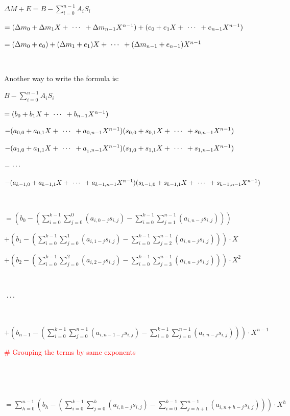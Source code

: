$\Delta M + E = B - \sum\limits_{i=0}^{n-1}A_iS_i$ 

$ = (\Delta m_0 + \Delta m_1X + \text{ } \text{$\cdots$} \text{ } + \Delta m_{n-1}X^{n-1}) + (e_0 + e_1X + \text{ } \text{$\cdots$} \text{ } + e_{n-1}X^{n-1})$

$= (\Delta m_0 + e_0) + (\Delta m_1 + e_1)X + \text{ } \text{$\cdots$} \text{ } + (\Delta m_{n-1} + e_{n-1})X^{n-1}$

$ $

\noindent Another way to write the formula is:

$B - \sum\limits_{i=0}^{n-1}A_iS_i$ 

$ = (b_0 + b_1X + \text{ } \text{$\cdots$} \text{ } + b_{n-1}X^{n-1} )$ 

$ - (a_{0,0} + a_{0,1}X + \text{ } \text{$\cdots$} \text{ } + a_{0, n-1}X^{n-1})(s_{0,0} + s_{0,1}X + \text{ } \text{$\cdots$} \text{ } + s_{0, n-1}X^{n-1})$ 

$ - (a_{1,0} + a_{1,1}X + \text{ } \text{$\cdots$} \text{ } + a_{_1, n-1}X^{n-1})(s_{1,0} + s_{1,1}X + \text{ } \text{$\cdots$} \text{ } + s_{1, n-1}X^{n-1})$ 

$ - \text{ } \text{$\cdots$} \text{ } $ 

$ - (a_{k-1,0} + a_{k-1,1}X + \text{ } \text{$\cdots$} \text{ } + a_{k-1, n-1}X^{n-1})(s_{k-1,0} + s_{k-1,1}X + \text{ } \text{$\cdots$} \text{ } + s_{k-1, n-1}X^{n-1})$ 

$ $

$ = \left(b_0 - \left( \sum\limits_{i=0}^{k-1} \sum\limits_{j=0}^{0}(a_{i,0-j}s_{i,j}) - \sum\limits_{i=0}^{k-1} \sum\limits_{j=1}^{n-1}(a_{i,n-j}s_{i,j}) \right)\right)$

$ + \left(b_1 - \left( \sum\limits_{i=0}^{k-1} \sum\limits_{j=0}^{1}(a_{i,1-j}s_{i,j}) - \sum\limits_{i=0}^{k-1} \sum\limits_{j=2}^{n-1}(a_{i,n-j}s_{i,j})   \right) \right)\cdot X$ 



$ + \left(b_2 - \left( \sum\limits_{i=0}^{k-1} \sum\limits_{j=0}^{2}(a_{i,2-j}s_{i,j}) - \sum\limits_{i=0}^{k-1} \sum\limits_{j=3}^{n-1}(a_{i,n-j}s_{i,j})   \right) \right)\cdot X^2$ 

$ $

$\text{ } \text{$\cdots$} \text{ }$ 

$ $

$ + \left(b_{n-1} - \left(  \sum\limits_{i=0}^{k-1} \sum\limits_{j=0}^{n-1}(a_{i,n-1-j}s_{i,j}) - \sum\limits_{i=0}^{k-1} \sum\limits_{j=n}^{n-1}(a_{i,n-j}s_{i,j})  \right) \right)\cdot X^{n-1}$ 

\textcolor{red}{\# Grouping the terms by same exponents}

$ $


$ $

$= \sum\limits_{h=0}^{n-1}  \left(b_h - \left(  \sum\limits_{i=0}^{k-1} \sum\limits_{j=0}^{h}(a_{i,h-j}s_{i,j}) - \sum\limits_{i=0}^{k-1} \sum\limits_{j=h+1}^{n-1}(a_{i,n+h-j}s_{i,j})  \right) \right)\cdot X^{h}  $


